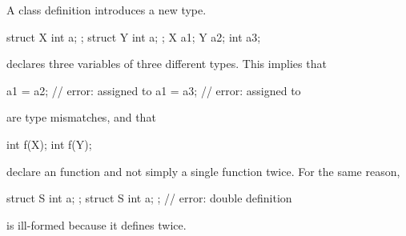 \pnum
A class definition introduces a new type.
\begin{example}
\begin{codeblock}
struct X { int a; };
struct Y { int a; };
X a1;
Y a2;
int a3;
\end{codeblock}
declares three variables of three different types. This implies that
\begin{codeblock}
a1 = a2;                        // error:  assigned to 
a1 = a3;                        // error:  assigned to 
\end{codeblock}
are type mismatches, and that
\begin{codeblock}
int f(X);
int f(Y);
\end{codeblock}
%
declare an  function  and not
simply a single function  twice. For the same reason,
\begin{codeblock}
struct S { int a; };
struct S { int a; };            // error: double definition
\end{codeblock}
is ill-formed because it defines  twice.
\end{example}


